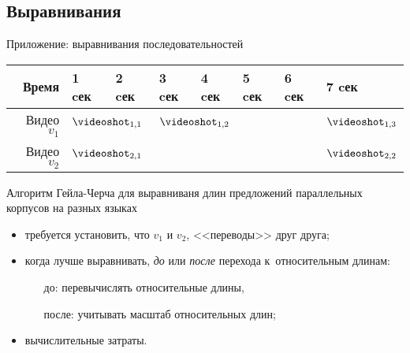 
\subsection{Выравнивания}



\begin{frame}{Приложение: выравнивания последовательностей}

    \vspace{20pt}
    \begin{tabular}{|r|l|l|l|l|l|l|l|}
        \hline  Время
            & 1 cек
            & 2 cек
            & 3 cек
            & 4 cек
            & 5 cек
            & 6 cек
            & 7 cек \\
        \hline
        \hline  Видео $v_1$
            & \multicolumn{2}{|l|}{ $\videoshot_{1, 1}$ }
            & \multicolumn{4}{|l|}{ $\videoshot_{1, 2}$ }
            &  $\videoshot_{1, 3}$\\
        \hline  Видео $v_2$
            & \multicolumn{6}{|l|}{ $\videoshot_{2, 1}$ }
            & $\videoshot_{2, 2}$ \\
        \hline
    \end{tabular}

    \vspace{12pt}
    
    Алгоритм Гейла-Черча для выравниваня длин предложений
    параллельных корпусов на разных языках
    \begin{itemize}
        \item требуется установить,
            что $v_1$ и $v_2$, <<переводы>> друг друга;
        \item когда лучше выравнивать, 
            {\it до} или {\it после} перехода к~относительным длинам:
            { \tiny
                \begin{itemize}
                    \item[до:] перевычислять относительные длины,
                    \item[после:] учитывать масштаб относительных длин;
                \end{itemize}
            }
        \item вычислительные затраты.
    \end{itemize}
\end{frame}
